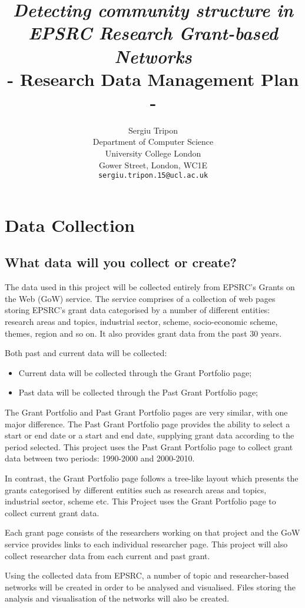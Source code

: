 \documentclass{article} %
\title{\textit{Detecting community structure in EPSRC Research Grant-based Networks}\\- Research Data Management Plan -}
\author{
Sergiu Tripon\\
Department of Computer Science\\
University College London\\
Gower Street, London, WC1E\\
\texttt{sergiu.tripon.15@ucl.ac.uk}\\
}
\begin{document}
\maketitle

\section{Data Collection}

\subsection{What data will you collect or create?}

The data used in this project will be collected entirely from EPSRC’s Grants on the Web (GoW) service. The service comprises of a collection of web pages storing EPSRC’s grant data categorised by a number of different entities: research areas and topics, industrial sector, scheme, socio-economic scheme, themes, region and so on. It also provides grant data from the past 30 years.

Both past and current data will be collected:

\begin{itemize}
    \item Current data will be collected through the Grant Portfolio page;
    \item Past data will be collected through the Past Grant Portfolio page;
\end{itemize}

The Grant Portfolio and Past Grant Portfolio pages are very similar, with one major difference. The Past Grant Portfolio page provides the ability to select a start or end date or a start and end date, supplying grant data according to the period selected. This project uses the Past Grant Portfolio page to collect grant data between two periods: 1990-2000 and 2000-2010.

In contrast, the Grant Portfolio page follows a tree-like layout which presents the grants categorised by different entities such as research areas and topics, industrial sector, scheme etc. This Project uses the Grant Portfolio page to collect current grant data.

Each grant page consists of the researchers working on that project and the GoW service provides links to each individual researcher page. This project will also collect researcher data from each current and past grant.

Using the collected data from EPSRC, a number of topic and researcher-based networks will be created in order to be analysed and visualised. Files storing the analysis and visualisation of the networks will also be created.
\end{document}
